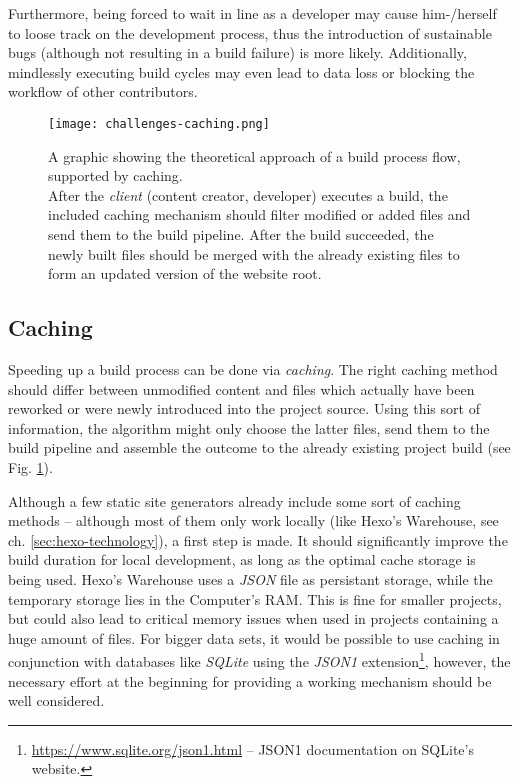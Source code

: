 Furthermore, being forced to wait in line as a developer may cause him-/herself to loose track on the development process, thus the introduction of sustainable bugs (although not resulting in a build failure) is more likely. Additionally, mindlessly executing build cycles may even lead to data loss or blocking the workflow of other contributors.

\begin{figure} %
    \centering
    \texttt{[image: challenges-caching.png]}
    \caption{A graphic showing the theoretical approach of a build process flow, supported by caching.\\
    After the \emph{client} (content creator, developer) executes a build, the included caching mechanism should filter modified or added files and send them to the build pipeline. After the build succeeded, the newly built files should be merged with the already existing files to form an updated version of the website root.}
    \label{fig:caching}
\end{figure}
%

\subsection{Caching}
Speeding up a build process can be done via \emph{caching}. The right caching method should differ between unmodified content and files which actually have been reworked or were newly introduced into the project source. Using this sort of information, the algorithm might only choose the latter files, send them to the build pipeline and assemble the outcome to the already existing project build (see Fig. \ref{fig:caching}).

Although a few static site generators already include some sort of caching methods -- although most of them only work locally (like Hexo's Warehouse, see ch. \ref{sec:hexo-technology}), a first step is made. It should significantly improve the build duration for local development, as long as the optimal cache storage is being used. Hexo's Warehouse uses a \emph{JSON} file as persistant storage, while the temporary storage lies in the Computer's RAM. This is fine for smaller projects, but could also lead to critical memory issues when used in projects containing a huge amount of files. For bigger data sets, it would be possible to use caching in conjunction with databases like \emph{SQLite} using the \emph{JSON1} extension\footnote{\url{https://www.sqlite.org/json1.html} -- JSON1 documentation on SQLite's website.}, however, the necessary effort at the beginning for providing a working mechanism should be well considered.


